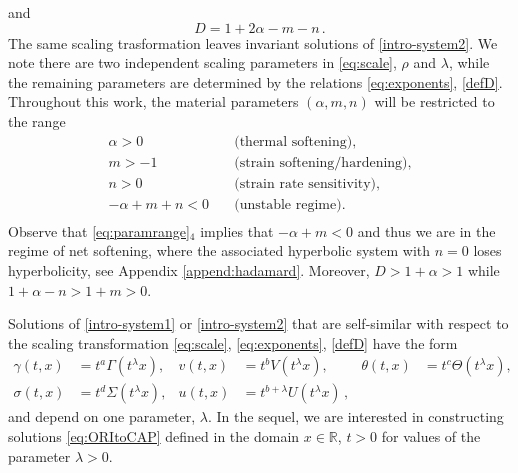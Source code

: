 \documentclass[11pt]{article}
\def\R{\mathbb{R}}
\newcommand{\tcb}{}
\theoremstyle{remark}
\begin{document}
and
\begin{equation}
\label{defD}
D = 1+2\alpha-m-n \, .
\end{equation}
\tcb{
The same scaling trasformation leaves invariant solutions of \eqref{intro-system2}.
We note there are two independent scaling parameters in \eqref{eq:scale}, $\rho$ and $\lambda$, while the
remaining parameters are
determined by the relations \eqref{eq:exponents}, \eqref{defD}.
}
Throughout this work, the material parameters $(\alpha,m,n)$ will be restricted to the range
\begin{equation}
\label{eq:paramrange}
 \begin{aligned}
  \alpha>0\quad&\text{(thermal softening)},\\
  m>-1 \quad&\text{(strain softening/hardening)}, \\%
  n>0 \quad&\text{(strain rate sensitivity)},\\ %
  -\alpha+m+n<0 \quad&\text{(unstable regime)}.  \\%
\end{aligned}
\end{equation}
Observe that \eqref{eq:paramrange}$_4$ implies that $-\alpha + m <  0$ and thus we are in the regime of net softening, where
the associated hyperbolic system with $n=0$ loses hyperbolicity, see Appendix \ref{append:hadamard}.  Moreover,
$D>1+\alpha>1$   {  while $1 + \alpha - n > 1 + m > 0$. }



Solutions of \eqref{intro-system1} or \eqref{intro-system2} that are self-similar with respect to the scaling transformation
 \eqref{eq:scale}, \eqref{eq:exponents}, \eqref{defD} have the form
\begin{equation}\label{eq:ORItoCAP}
\begin{aligned}
 \gamma(t,x) &= t^a\Gamma(t^\lambda x), & v(t,x) &= t^b V(t^\lambda x), &\theta(t,x) &= t^c \Theta(t^\lambda x),\\
 \sigma(t,x) &= t^d \Sigma(t^\lambda x), & u(t,x) &= t^{b+\lambda} U(t^\lambda x) \, ,
\end{aligned}
\end{equation}
and depend on one parameter, $\lambda$. In the sequel, we are interested in constructing solutions \eqref{eq:ORItoCAP}
defined in the domain $x \in \R$, $t > 0$ for values of the parameter $\lambda > 0$.
\end{document}
